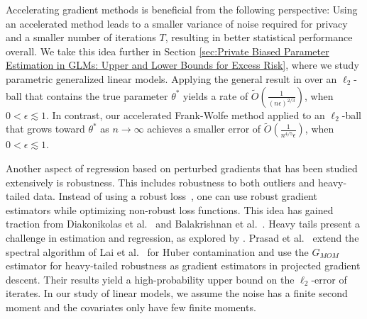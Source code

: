 \documentclass{article}
\begin{document}
Accelerating gradient methods is beneficial from the following perspective: Using an accelerated method leads to a smaller variance of noise required for privacy and a smaller number of iterations $T$, resulting in better statistical performance overall. We take this idea further in Section \ref{sec:Private Biased Parameter Estimation in GLMs: Upper and Lower Bounds for Excess Risk}, where we study parametric generalized linear models. Applying the general result in \cite{NOPL} over an $\ell_2$-ball that contains the true parameter $\theta^*$ yields a rate of $\widetilde{O}\left(\frac{1}{(n\epsilon)^{2/3}}\right)$, when $0 < \epsilon \lesssim 1$. In contrast, our accelerated Frank-Wolfe method applied to an $\ell_2$-ball that grows toward $\theta^*$ as $n \rightarrow \infty$ achieves a smaller error of $\widetilde{O}\left(\frac{1}{n^{4/5}\epsilon}\right)$, when $0 < \epsilon \lesssim 1$. 

Another aspect of regression based on perturbed gradients that has been studied extensively is robustness. This includes robustness to both outliers and heavy-tailed data. Instead of using a robust loss~\cite{Huber1, Huber2, Hampel}, one can use robust gradient estimators while optimizing non-robust loss functions. This idea has gained traction from Diakonikolas et al.~\cite{CompIntr} and Balakrishnan et al.~\cite{Balakrish}. Heavy tails present a challenge in estimation and regression, as explored by \cite{LUGOSI_MEAN_ESTIM_HT, PENSIA_ROB_HT, Minsker}. Prasad et al.~\cite{RE} extend the spectral algorithm of Lai et al.~\cite{Vpala} for Huber contamination and use the $G_{MOM}$ estimator for heavy-tailed robustness as gradient estimators in projected gradient descent. Their results yield a high-probability upper bound on the $\ell_2$-error of iterates. In our study of linear models, we assume the noise has a finite second moment and the covariates only have few finite moments.
\end{document}
